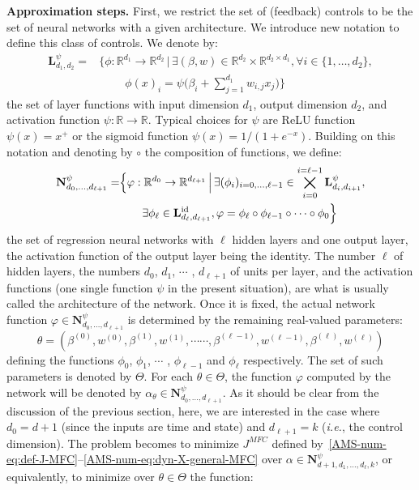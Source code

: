 \documentclass{amsproc}
\theoremstyle{definition}
\theoremstyle{remark}
\numberwithin{equation}{section}
\newcommand{\RR}{{\mathbb R}}
\newcommand{\bN}{{\mathbf N}}
\newcommand{\ctrl}{\alpha}
\newcommand{\ctrldim}{k}
\begin{document}
\textbf{Approximation steps.} First, we restrict the set of (feedback) controls to be the set of neural networks with a given architecture. We introduce new notation to define this class of controls. 
We denote by:
\begin{align*}
	\mathbf{L}^\psi_{d_1, d_2} = 
	&\Big\{ \phi: \RR^{d_1} \to \RR^{d_2} \,\Big|\,  \exists (\beta, w) \in  \RR^{d_2} \times \RR^{d_2 \times d_1}, \forall  i \in \{1,\dots,d_2\}, 
	\\
	&\qquad \;\phi(x)_i = \psi\Big(\beta_i + \sum_{j=1}^{d_1} w_{i,j} x_j\Big) \Big\} 
\end{align*}
the set of layer functions with input dimension $d_1$, output dimension $d_2$, and activation function $\psi: \RR \to \RR$. Typical choices for $\psi$ are ReLU function $\psi(x) = x^+$ or the sigmoid function $\psi(x) = 1/(1+e^{-x})$. 
Building on this notation and denoting by $\circ$ the composition of functions, we define:
\begin{align}
\label{eq:NNarchi-FFC}
	\bN^\psi_{d_0, \dots, d_{\ell+1}} 
	= 
	&\Big\{ \varphi: \RR^{d_0} \to \RR^{d_{\ell+1}} \,\Big|\, \exists (\phi_i)_{i=0, \dots, \ell-1} \in \bigtimes_{i=0}^{i=\ell-1} \mathbf{L}^\psi_{d_i, d_{i+1}}, 
	\\
	&\qquad \exists \phi_\ell \in \mathbf{L}^{\mathrm{id}}_{d_{\ell}, d_{\ell+1}}, \varphi = \phi_\ell \circ \phi_{\ell-1} \circ \dots \circ \phi_0  \Big\} \, 
	\notag
\end{align}
 the set of regression neural networks with $\ell$ hidden layers and one output layer, the activation function of the output layer being the identity. The number $\ell$ of hidden layers, the numbers $d_0$, $d_1$, $\cdots$ , $d_{\ell+1}$ of units per layer, and the activation functions (one single function $\psi$ in the present situation), are what is usually called the architecture of the network. Once it is fixed, the actual network function $\varphi\in \bN^\psi_{d_0, \dots, d_{\ell+1}} $ is determined by the remaining real-valued parameters:
 $$
 \theta=(\beta^{(0)}, w^{(0)},\beta^{(1)}, w^{(1)},\cdots\cdots,\beta^{(\ell-1)}, w^{(\ell-1)},\beta^{(\ell)}, w^{(\ell)})
 $$
defining the functions $\phi_0$, $\phi_1$, $\cdots$ , $\phi_{\ell-1}$ and $\phi_\ell$ respectively. The set of such parameters is denoted by $\Theta$. For each $\theta\in\Theta$, the function $\varphi$ computed by the network will be denoted by $\ctrl_\theta \in \bN^\psi_{d_0, \dots, d_{\ell+1}}$.
As it should be clear from the discussion of the previous section, here, we are interested in the  case where $d_0 = d+1$ (since the inputs are time and state) and $d_{\ell+1} = \ctrldim$ (\textit{i.e.}, the control dimension). The problem becomes to minimize $J^{MFC}$ defined by~\eqref{AMS-num-eq:def-J-MFC}--\eqref{AMS-num-eq:dyn-X-general-MFC} over $\ctrl \in \bN^\psi_{d+1, d_1, \dots, d_{\ell}, \ctrldim} $, or equivalently, to minimize over $\theta \in \Theta$ the function:
\end{document}
